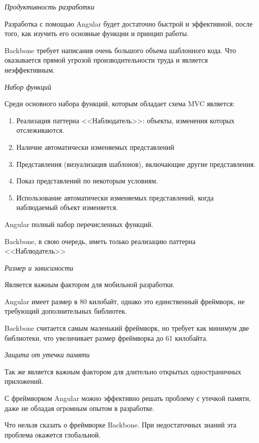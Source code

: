 {\itshape Продуктивность разработки}

Разработка с помощью Angular будет достаточно быстрой и эффективной, после того, как изучить его основные функции и принцип работы.

Backbone требует написания очень большого объема шаблонного кода. Что оказывается прямой угрозой производительности труда и является неэффективным.

{\itshape Набор функций}

Среди основного набора функций, которым обладает схема MVC является:
\begin{enumerate}
\item Реализация паттерна <<Наблюдатель>>: объекты, изменения которых отслеживаются.
\item  Наличие автоматически изменяемых представлений
\item Представления (визуализация шаблонов), включающие другие представления.
\item Показ представлений по некоторым условиям.
\item Использование автоматически изменяемых представлений, когда наблюдаемый объект изменяется.
\end{enumerate}

Angular полный набор перечисленных функций.

Backbone, в свою очередь, иметь только реализацию паттерна <<Наблюдатель>>

{\itshape Размер и зависимости} 

Является важным фактором для мобильной разработки.

Angular имеет размер в 80 килобайт, однако это единственный фреймворк, не требующий дополнительных библиотек.

Backbone считается самым маленький фреймворк, но требует как минимум две библиотеки, что увеличивает размер фреймворка до 61 килобайта.

{\itshape Защита от утечки памяти} 

Так же является важным фактором для длительно открытых одностраничных приложений.

С фреймворком Angular можно эффективно решать проблему с утечкой памяти, даже не обладая огромным опытом в разработке.

Что нельзя сказать о фреймворке Backbone. При недостаточных знаний эта проблема окажется глобальной.

